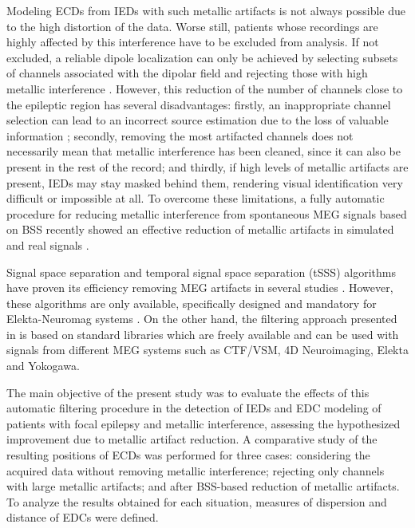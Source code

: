 Modeling ECDs from IEDs with such metallic artifacts is not always possible due to the high distortion of the data. Worse still, patients whose recordings are highly affected by this interference have to be excluded from analysis. If not excluded, a reliable dipole localization can only be achieved by selecting subsets of channels associated with the dipolar field and rejecting those with high metallic interference \citep{Bagic2011}. However, this reduction of the number of channels close to the epileptic region has several disadvantages: firstly, an inappropriate channel selection can lead to an incorrect source estimation due to the loss of valuable information \citep{Bagic2011}; secondly, removing the most artifacted channels does not necessarily mean that metallic interference has been cleaned, since it can also be present in the rest of the record; and thirdly, if high levels of metallic artifacts are present, IEDs may stay masked behind them, rendering visual identification very difficult or impossible at all. To overcome these limitations, a fully automatic procedure for reducing metallic interference from spontaneous MEG signals based on BSS recently showed an effective reduction of metallic artifacts in simulated and real signals \citep{Migliorelli2015}.

Signal space separation and temporal signal space separation (tSSS) algorithms \citep{Taulu2006} have proven its efficiency removing MEG artifacts in several studies \citep{Song2009,Kakisaka2012,Jin2013,Wang2013}. However, these algorithms are only available, specifically designed and mandatory for Elekta-Neuromag systems \citep{GonzalezMoreno2014}. On the other hand, the filtering approach presented in \citep{Migliorelli2015} is based on standard libraries which are freely available and can be used with signals from different MEG systems such as CTF/VSM, 4D Neuroimaging, Elekta and Yokogawa.

The main objective of the present study was to evaluate the effects of this automatic filtering procedure in the detection of IEDs and EDC modeling of patients with focal epilepsy and metallic interference, assessing the hypothesized improvement due to metallic artifact reduction. A comparative study of the resulting positions of ECDs was performed for three cases: considering the acquired data without removing metallic interference; rejecting only channels with large metallic artifacts; and after BSS-based reduction of metallic artifacts. To analyze the results obtained for each situation, measures of dispersion and distance of EDCs were defined.

